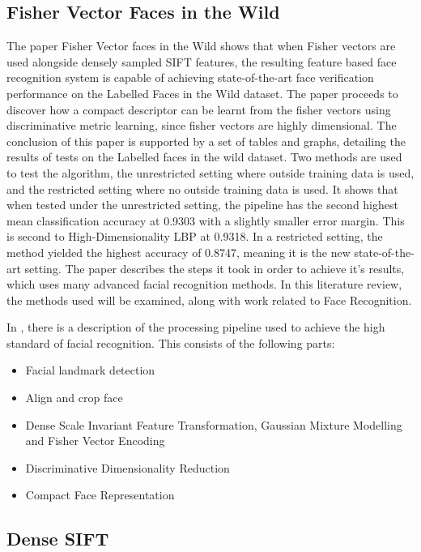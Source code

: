 \documentclass[12pt, a4paper]{article}
\begin{document}
\subsection{Fisher Vector Faces in the Wild}
The paper Fisher Vector faces in the Wild \cite{simonyan2004fisher} shows that when Fisher vectors are used alongside densely sampled SIFT features, the resulting feature based face recognition system is capable of achieving state-of-the-art face verification performance on the Labelled Faces in the Wild \cite{labelledFaces} dataset. The paper proceeds to discover how a compact descriptor can be learnt from the fisher vectors using discriminative metric learning, since fisher vectors are highly dimensional. The conclusion of this paper is supported by a set of tables and graphs, detailing the results of tests on the Labelled faces in the wild dataset. Two methods are used to test the algorithm, the unrestricted setting where outside training data is used, and the restricted setting where no outside training data is used. It shows that when tested under the unrestricted setting, the pipeline has the second highest mean classification accuracy at 0.9303 with a slightly smaller error margin. This is second to High-Dimensionality LBP at 0.9318. In a restricted setting, the method yielded the highest accuracy of 0.8747, meaning it is the new state-of-the-art setting. The paper describes the steps it took in order to achieve it’s results, which uses many advanced facial recognition methods. In this literature review, the methods used will be examined, along with work related to Face Recognition.

In \cite{simonyan2004fisher}, there is a description of the processing pipeline used to achieve the high standard of facial recognition. This consists of the following parts:
\begin{itemize}
\item Facial landmark detection
\item Align and crop face
\item Dense Scale Invariant Feature Transformation, Gaussian Mixture Modelling and Fisher Vector Encoding
\item Discriminative Dimensionality Reduction
\item Compact Face Representation
\end{itemize}


\subsection{Dense SIFT}
\end{document}
